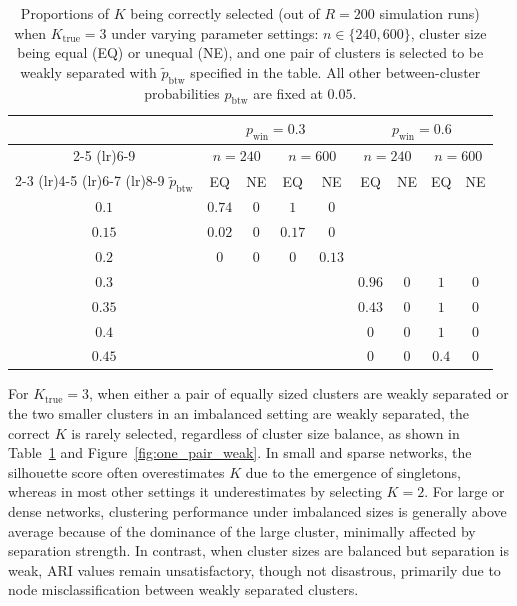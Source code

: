 \documentclass[12pt, titlepage, reqno]{article}
\begin{document}
\begin{table}[tbh]
	\centering
	\renewcommand{\arraystretch}{1.25}
	\caption{Proportions of $K$ being correctly selected (out of $R 
	= 200$ simulation runs) when $K_\text{true} = 3$ under varying 
	parameter settings: $n \in \{240, 600\}$, cluster size being 
	equal (EQ) or unequal (NE), and one pair of clusters is selected 
	to be weakly separated with $\tilde{p}_{\text{btw}}$ specified in 
	the table. All other between-cluster probabilities 
	${p}_\text{btw}$ are fixed at $0.05$.} 
	\label{tab:unweighted_one_pair}
	\setlength{\tabcolsep}{12pt}
	\small
	\begin{tabular}{c cc cc cc cc}
		\toprule
		& \multicolumn{4}{c}{$p_{\text{win}} = 0.3$} & 
		\multicolumn{4}{c}{$p_{\text{win}} = 0.6$} \\
		\cmidrule(lr){2-5} \cmidrule(lr){6-9}
		& \multicolumn{2}{c}{$n = 240$} & \multicolumn{2}{c}{$n = 
		600$} 
		& \multicolumn{2}{c}{$n = 240$} & \multicolumn{2}{c}{$n = 
		600$} \\
		\cmidrule(lr){2-3} \cmidrule(lr){4-5} 
		\cmidrule(lr){6-7} \cmidrule(lr){8-9}
		$\tilde{p}_{\text{btw}}$ & EQ & NE & EQ & NE & EQ & NE & EQ & 
		NE \\
		\midrule
		$0.1$  & $0.74$ & $0$ & $1$ & $0$ & & & & \\
		$0.15$ & $0.02$ & $0$ & $0.17$ & $0$ & & & & \\
		$0.2$  & $0$ & $0$ & $0$ & $0.13$ & & & & \\
		$0.3$  & & & & & $0.96$ & $0$ & $1$ & $0$ \\
		$0.35$ & & & & & $0.43$ & $0$ & $1$ & $0$ \\
		$0.4$  & & & & & $0$ & $0$ & $1$ & $0$ \\
		$0.45$ & & & & & $0$ & $0$ & $0.4$ & $0$ \\
		\bottomrule
	\end{tabular}
\end{table}


For $K_{\text{true}} = 3$, when either a pair of equally sized 
clusters are weakly separated or the two smaller clusters in an 
imbalanced setting are weakly separated, the correct $K$ is rarely 
selected, regardless of cluster size balance, as shown in 
Table~\ref{tab:unweighted_one_pair} and 
Figure~\ref{fig:one_pair_weak}. In small and sparse networks, the 
silhouette score often overestimates $K$ due to the emergence of 
singletons, whereas in most other settings it underestimates by 
selecting $K = 2$. For large or dense networks, clustering 
performance under imbalanced sizes is generally above average because 
of the dominance of the large cluster, minimally affected by 
separation strength. In contrast, when cluster sizes are balanced but 
separation is weak, ARI values remain unsatisfactory, though not 
disastrous, primarily due to node misclassification between weakly 
separated clusters.
\end{document}

